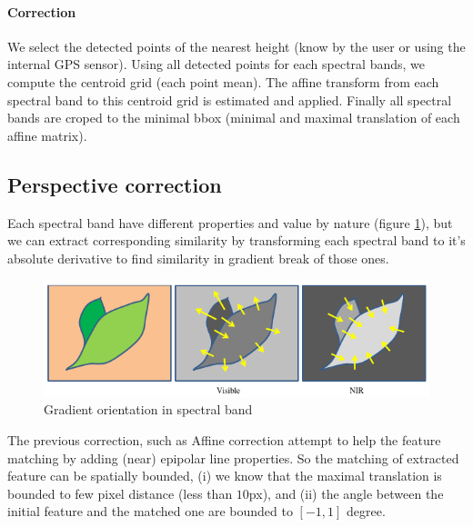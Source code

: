 \documentclass[]{elsarticle}
\begin{document}
			\paragraph{Correction} We select the detected points of the nearest height (know by the user or using the internal GPS sensor).
			Using all detected points for each spectral bands, we compute the centroid grid (each point mean).
			The affine transform from each spectral band to this centroid grid is estimated and applied.
			Finally all spectral bands are croped to the minimal bbox (minimal and maximal translation of each affine matrix).
		
		\subsection{Perspective correction}
		
			Each spectral band have different properties and value by nature (figure \ref{fig:vegetable-gradient}),
			but we can extract corresponding similarity by transforming each spectral band to it's absolute derivative
			to find similarity in gradient break of those ones.
			
			\begin{figure}[!htb]
				\centering
				\includegraphics[width=\linewidth]{../figures/contrast-inversion.png}
				\caption{Gradient orientation in spectral band \cite{rabatel:hal-01684135}}
				\label{fig:vegetable-gradient}
			\end{figure}
		
			\par The previous correction, such as Affine correction attempt to help the feature matching by adding (near) epipolar line properties.
			So the matching of extracted feature can be spatially bounded,
			(i) we know that the maximal translation is bounded to few pixel distance (less than $10$px),
			and (ii) the angle between the initial feature and the matched one are bounded to $[-1,1]$ degree.
			
\end{document}
